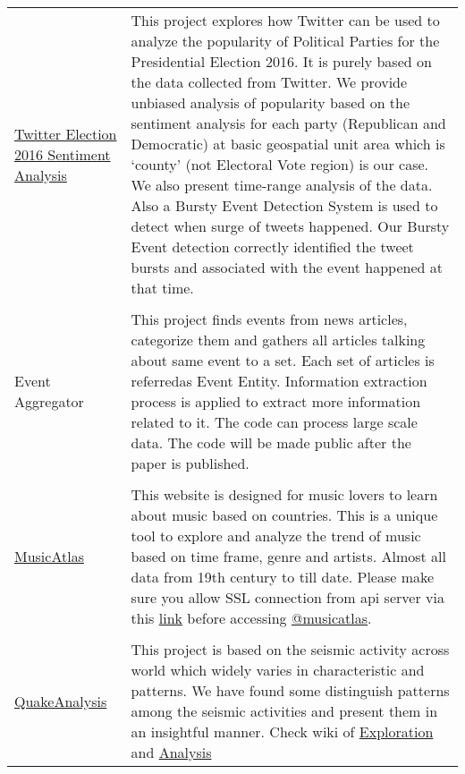 \documentclass[8pt]{article}
\renewcommand{\section}[2]%
        {\pagebreak[2]\vspace{1.3\baselineskip}%
         \phantomsection\addcontentsline{toc}{section}{#1}%
         \hspace{0in}%
         \marginpar{
         \raggedright \scshape #1}#2}
\begin{document}
\section{Projects}
\begin{tabular}[t]{@{}p{\textwidth-\rcollength-130pt}p{\rcollength+130pt}}
        \href{http://estorm.org}{Twitter Election 2016 Sentiment Analysis} & \hspace{0.5cm} This project explores how Twitter can be used to analyze the popularity of Political Parties for the Presidential Election 2016. It is purely based on the data collected from Twitter. We provide unbiased analysis of popularity based on the sentiment analysis for each party (Republican and Democratic) at basic geospatial unit area which is `county' (not Electoral Vote region) is our case. We also present time-range analysis of the data. Also a Bursty Event Detection System is used to detect when surge of tweets happened. Our Bursty Event detection correctly identified the tweet bursts and associated with the event happened at that time. \\ 
        \\
         Event Aggregator & \hspace{0.5cm}  This project finds events from news articles, categorize them and gathers all articles talking about same event to a set. Each set of articles is referredas Event Entity. Information extraction process is applied to extract more information related to it. The code can process large scale data. The code will be made public after the paper is published.  \\ 
        \\
        \href{https://musicatlas.github.io/}{MusicAtlas} & \hspace{0.5cm}  This website is designed for music lovers to learn about music based on countries. This is a unique tool to explore and analyze the trend of music based on time frame, genre and artists. Almost all data from 19th century to till date. Please make sure you allow SSL connection from api server via this \href{https://db03.cs.utah.edu:8181/api/country_track}{link} before accessing \href{https://musicatlas.github.io/musicatlas/}{@musicatlas}.\\[0.5cm]
        \\
         \href{https://bitbucket.org/debjyotipaul385/quakeanalysis/wiki/Home}{QuakeAnalysis} & \hspace{0.5cm}  This project is based on the seismic activity across world which widely varies in characteristic and patterns. We have found some distinguish patterns among the seismic activities and present them in an insightful manner. Check wiki of \href{https://bitbucket.org/debjyotipaul385/quakeanalysis/wiki/Exploration}{Exploration} and \href{https://bitbucket.org/debjyotipaul385/quakeanalysis/wiki/Analysis}{Analysis}\\

\end{tabular}
\end{document}

